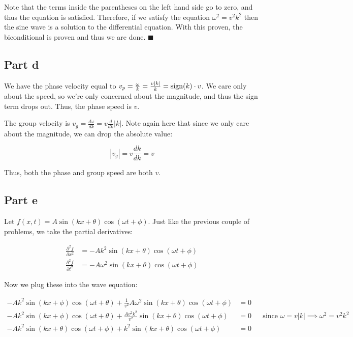 \documentclass{article}
\theoremstyle{definition}
\numberwithin{equation}{section}
\numberwithin{definition}{section}
\begin{document}
Note that the terms inside the parentheses on the left hand side go to zero, and thus the equation is satisfied. Therefore, if we satisfy the equation $\omega^2 = v^2k^2$ then the sine wave is a solution to the differential equation. With this proven, the biconditional is proven and thus we are done. $\blacksquare$

\subsection*{Part d}

We have the phase velocity equal to $v_p = \frac{\omega}{k} = \frac{v|k|}{k} = \operatorname{sign}(k) \cdot v$. We care only about the speed, so we're only concerned about the magnitude, and thus the sign term drops out. Thus, the phase speed is $v$. 

\medskip

The group velocity is $v_g = \frac{d\omega}{dk} = v \frac{d}{dk} |k|$. Note again here that since we only care about the magnitude, we can drop the absolute value:

\[ |v_g| = v \frac{dk}{dk} = v\]

Thus, both the phase and group speed are both $v$.

\subsection*{Part e}

Let $f(x, t) = A\sin(kx + \theta) \cos (\omega t + \phi)$. Just like the previous couple of problems, we take the partial derivatives:

\begin{align*}
    \frac{\partial^2f}{\partial x^2} &= -Ak^2\sin(kx + \theta) \cos (\omega t + \phi)\\
    \frac{\partial^2f}{\partial t^2} &= -A\omega^2 \sin (kx + \theta) \cos (\omega t + \phi)
\end{align*}

Now we plug these into the wave equation:

\begin{align*}
    -Ak^2\sin(kx + \phi) \cos (\omega t + \theta) + \frac{1}{v^2}A\omega^2\sin (kx + \theta)\cos(\omega t + \phi) &= 0\\
    -Ak^2 \sin (kx + \phi) \cos(\omega t + \theta) + \frac{Av^2k^2}{v^2} \sin (kx + \theta) \cos (\omega t + \phi) &= 0 && \text{since $\omega = v|k| \implies \omega^2 = v^2k^2$}\\
    -Ak^2\sin(kx + \theta)\cos(\omega t + \phi) + k^2\sin(kx + \theta) \cos(\omega t + \phi) &= 0
\end{align*}
\end{document}
